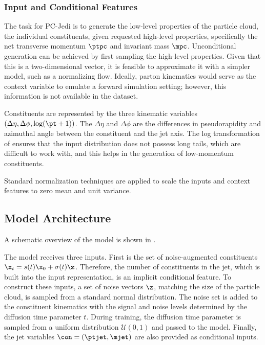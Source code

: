 \subsubsection{Input and Conditional Features}

The task for PC-Jedi is to generate the low-level properties of the particle cloud, the individual constituents, given requested high-level properties, specifically the net transverse momentum $\ptpc$ and invariant mass $\mpc$.
Unconditional generation can be achieved by first sampling the high-level properties.
Given that this is a two-dimensional vector, it is feasible to approximate it with a simpler model, such as a normalizing flow.
Ideally, parton kinematics would serve as the context variable to emulate a forward simulation setting; however, this information is not available in the dataset.

Constituents are represented by the three kinematic variables $\left(\Delta\eta, \Delta\phi, \log(\pt + 1)\right)$.
The $\Delta\eta$ and $\Delta\phi$ are the differences in pseudorapidity and azimuthal angle between the constituent and the jet axis.
The log transformation of \pt ensures that the input distribution does not possess long tails, which are difficult to work with, and this helps in the generation of low-momentum constituents.

Standard normalization techniques are applied to scale the inputs and context features to zero mean and unit variance.

\subsection{Model Architecture}

A schematic overview of the \pcjedi model is shown in .

The model receives three inputs.
First is the set of noise-augmented constituents $\x_t = s(t) \x_0 + \sigma(t) \z$.
Therefore, the number of constituents in the jet, which is built into the input representation, is an implicit conditional feature.
To construct these inputs, a set of noise vectors $\z$, matching the size of the particle cloud, is sampled from a standard normal distribution.
The noise set is added to the constituent kinematics with the signal and noise levels determined by the diffusion time parameter $t$.
During training, the diffusion time parameter is sampled from a uniform distribution $\mathcal{U}(0, 1)$ and passed to the model.
Finally, the jet variables $\con = (\ptjet, \mjet)$ are also provided as conditional inputs.

